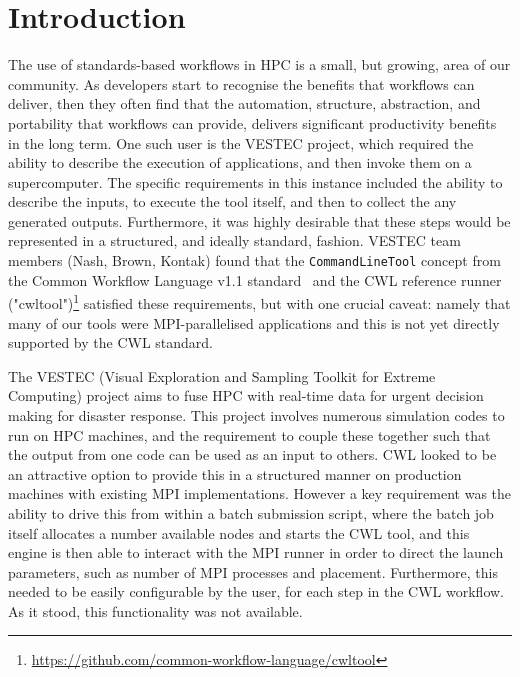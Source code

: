 \documentclass[conference]{IEEEtran}
\newcommand{\cwl}[1]{\texttt{#1}}
\begin{document}

%
\IEEEpeerreviewmaketitle

\section{Introduction}
The use of standards-based workflows in HPC is a small, but growing, area of our community. As developers start to recognise the benefits that workflows can deliver, then they often find that the automation, structure, abstraction, and portability that workflows can provide, delivers significant productivity benefits in the long term. One such user is the VESTEC project, which required the ability to describe the execution of applications, and then invoke them on a supercomputer. The specific requirements in this instance included the ability to describe the inputs, to execute the tool itself, and then to collect the any generated outputs. Furthermore, it was highly desirable that these steps would be represented in a structured, and ideally standard, fashion. VESTEC team members (Nash, Brown, Kontak) found that the \cwl{CommandLineTool} concept from the Common Workflow Language v1.1 standard~\cite{cwl10} and the CWL reference runner ("cwltool")\footnote{\url{https://github.com/common-workflow-language/cwltool}} satisfied these requirements, but with one crucial caveat: namely that many of our tools were MPI-parallelised applications and this is not yet directly supported by the CWL standard.

The VESTEC (Visual Exploration and Sampling Toolkit for Extreme Computing) project aims to fuse HPC with real-time data for urgent decision making for disaster response. This project involves numerous simulation codes to run on HPC machines, and the requirement to couple these together such that the output from one code can be used as an input to others. CWL looked to be an attractive option to provide this in a structured manner on production machines with existing MPI implementations. However a key requirement was the ability to drive this from within a batch submission script, where the batch job itself allocates a number available nodes and starts the CWL tool, and this engine is then able to interact with the MPI runner in order to direct the launch parameters, such as number of MPI processes and placement. Furthermore, this needed to be easily configurable by the user, for each step in the CWL workflow. As it stood, this functionality was not available.
\end{document}
